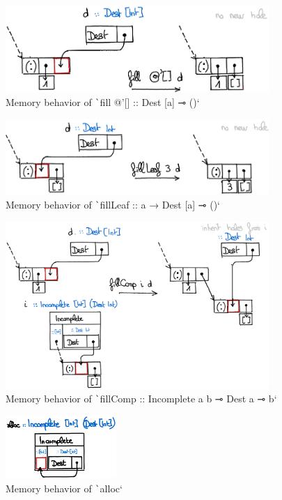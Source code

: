 \documentclass[english]{jflart}
\begin{document}
\begin{figure}[t]\centering
  \includegraphics[width=10cm]{fillNil.png}
  \caption{Memory behavior of \texttt`fill @'[] :: Dest [a] ⊸ ()`}
  \label{fig:schema-fillNil}
\end{figure}

\begin{figure}[t]\centering
  \includegraphics[width=10cm]{fillLeaf.png}
  \caption{Memory behavior of \texttt`fillLeaf :: a → Dest [a] ⊸ ()`}
  \label{fig:schema-fillLeaf}
\end{figure}

\begin{figure}[t]\centering
  \includegraphics[width=10cm]{fillComp.png}
  \caption{Memory behavior of \texttt`fillComp :: Incomplete a b ⊸ Dest a ⊸ b`}
  \label{fig:schema-fillComp}
\end{figure}

\begin{figure}[t]\centering
  \includegraphics[width=4.2cm]{alloc.png}
  \caption{Memory behavior of \texttt`alloc`}
  \label{fig:schema-alloc}
\end{figure}
\end{document}
